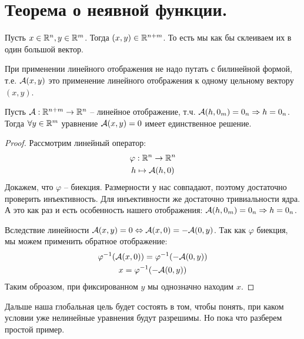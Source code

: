 \section{Теорема о неявной функции.}

\begin{conj}
    Пусть $x \in \mathbb{R}^n, y \in \mathbb{R}^m$. 
    Тогда $(x, y) \in \mathbb{R}^{n + m}$.  
    То есть мы как бы склеиваем их в один большой вектор.
\end{conj}

\begin{notice}
    При применении линейного отображения не надо путать с билинейной формой, т.е. $\mathcal{A}(x, y)$ это применение линейного отображения к одному цельному вектору $(x, y)$.
\end{notice}

\begin{lemma}
    Пусть $\mathcal{A} : \mathbb{R}^{n + m} \to \mathbb{R}^n$ -- линейное отображение, т.ч. $\mathcal{A}(h, 0_m) = 0_n \Rightarrow h = 0_n$.
    \\ Тогда $\forall y \in \mathbb{R}^m$ уравнение $\mathcal{A}(x, y) = 0$ имеет единственное решение.
\end{lemma}
\begin{proof}
    Рассмотрим линейный оператор: \begin{gather*}
        \varphi: \mathbb{R}^n \to \mathbb{R}^n \\
        h \mapsto \mathcal{A}(h, 0)
    \end{gather*}
    \quad Докажем, что $\varphi$ -- биекция.
    Размерности у нас совпадают, поэтому достаточно проверить инъективность.
    Для инъективности же достаточно тривиальности ядра. 
    А это как раз и есть особенность нашего отображения: $\mathcal{A}(h, 0_m) = 0_n \Rightarrow h = 0_n$.

    \quad Вследствие линейности $\mathcal{A}(x, y) = 0 \Leftrightarrow \mathcal{A}(x, 0) = -\mathcal{A}(0, y)$.
    Так как $\varphi$ биекция, мы можем применить обратное отображение:
    \begin{gather*} 
        \varphi^{-1}(\mathcal{A}(x, 0)) = \varphi^{-1}(-\mathcal{A}(0, y)) \\
        x = \varphi^{-1}(-\mathcal{A}(0, y))
    \end{gather*}
    \quad Таким оброазом, при фиксированном $y$ мы однозначно находим $x$. 
\end{proof}

Дальше наша глобальная цель будет состоять в том, чтобы понять, при каком условии уже нелинейные уравнения будут разрешимы.
Но пока что разберем простой пример.

\vspace*{5mm}


